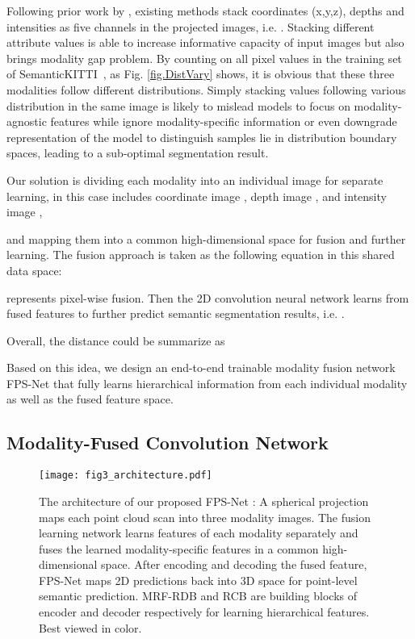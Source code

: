 \documentclass[preprint,review,3p]{elsarticle}
\begin{document}
Following prior work by \cite{wu2018squeezeseg}, existing methods \cite{wu2018squeezeseg,wu2019squeezesegv2,xu2020squeezesegv3, milioto2019rangenet++, alonso20203d, cortinhal2020salsanext} stack coordinates (x,y,z), depths and intensities as five channels in the projected images, i.e. . Stacking different attribute values is able to increase informative capacity of input images but also brings modality gap problem. By counting on all pixel values in the training set of SemanticKITTI~\cite{behley2019semantickitti}, as Fig. \ref{fig.DistVary} shows, it is obvious that these three modalities follow different distributions. 
Simply stacking values following various distribution in the same image is likely to mislead models to focus on modality-agnostic features while ignore modality-specific information or even downgrade representation of the model to distinguish samples lie in distribution boundary spaces, leading to a sub-optimal segmentation result. 

Our solution is dividing each modality into an individual image for separate learning, in this case includes coordinate image ,  depth image , and intensity image ,

and mapping them into a common high-dimensional space for fusion and further learning. The fusion approach is taken as the following equation in this shared data space: 

 represents pixel-wise fusion. Then the 2D convolution neural network  learns from fused features to further predict semantic segmentation results, i.e. . 

Overall, the distance could be summarize as


Based on this idea, we design an end-to-end trainable modality fusion network FPS-Net that fully learns hierarchical information from each individual modality as well as the fused feature space. 

\subsection{Modality-Fused Convolution Network}

\begin{figure}
  \centering
  \texttt{[image: fig3\_architecture.pdf]}
  \caption{The architecture of our proposed FPS-Net : A spherical projection maps each point cloud scan into three modality images. The fusion learning network learns features of each modality separately and fuses the learned modality-specific features in a common high-dimensional space. After encoding and decoding the fused feature, FPS-Net maps 2D predictions back into 3D space for point-level semantic prediction. MRF-RDB and RCB are building blocks of encoder and decoder respectively for learning hierarchical features. Best viewed in color.}
  \label{fig.model}
\end{figure}
\end{document}
